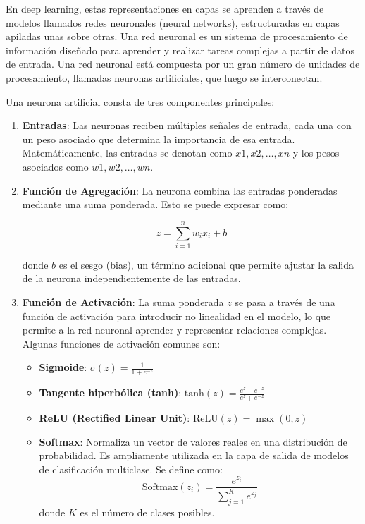 En deep learning, estas representaciones en capas se aprenden a través de modelos llamados redes neuronales (neural networks), estructuradas en capas apiladas unas sobre otras. Una red neuronal es un sistema de procesamiento de información diseñado para aprender y realizar tareas complejas a partir de datos de entrada. Una red neuronal está compuesta por un gran número de unidades de procesamiento, llamadas neuronas artificiales, que luego se interconectan.

Una neurona artificial consta de tres componentes principales:

\begin{enumerate}
    \item \textbf{Entradas}: Las neuronas reciben múltiples señales de entrada, cada una con un peso asociado que determina la importancia de esa entrada. Matemáticamente, las entradas se denotan como \(x1,x2,…,xn\) y los pesos asociados como \(w1,w2,…,wn\).

    \item \textbf{Función de Agregación}: La neurona combina las entradas ponderadas mediante una suma ponderada. Esto se puede expresar como:
    
    \[z = \sum_{i=1}^{n} w_i x_i + b\]

    donde \(b\) es el sesgo (bias), un término adicional que permite ajustar la salida de la neurona independientemente de las entradas.

    \item \textbf{Función de Activación}: La suma ponderada \(z\) se pasa a través de una función de activación para introducir no linealidad en el modelo, lo que permite a la red neuronal aprender y representar relaciones complejas. Algunas funciones de activación comunes son:
    \begin{itemize}
        \item \textbf{Sigmoide}: \(\sigma(z) = \frac{1}{1 + e^{-z}}\)
        
        \item \textbf{Tangente hiperbólica (tanh)}: \(\text{tanh}(z) = \frac{e^z - e^{-z}}{e^z + e^{-z}}\)
        
        \item \textbf{ReLU (Rectified Linear Unit)}: \(\text{ReLU}(z) = \max(0, z)\)
        
        \item \textbf{Softmax}: Normaliza un vector de valores reales en una distribución de probabilidad. Es ampliamente utilizada en la capa de salida de modelos de clasificación multiclase. Se define como:
        \[
        \text{Softmax}(z_i) = \frac{e^{z_i}}{\sum_{j=1}^{K} e^{z_j}}
        \]
        donde \(K\) es el número de clases posibles.
        

\end{itemize}
\end{enumerate}

